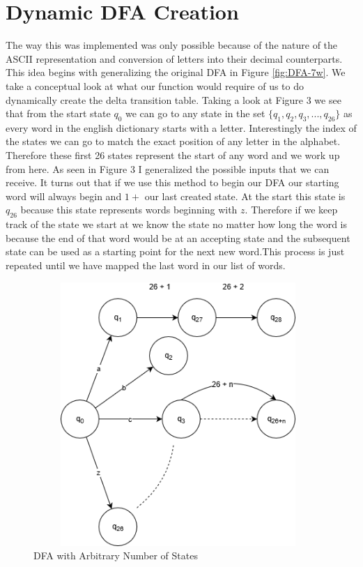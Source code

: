 \documentclass[letter, 12pt]{article}
\begin{document}
\section*{Dynamic DFA Creation}
The way this was implemented was only possible because of the nature of the ASCII representation and conversion of letters into their decimal counterparts. This idea begins with generalizing the original DFA in Figure \ref{fig:DFA-7w}. We take a conceptual look at what our function would require of us to do dynamically create the delta transition table. Taking a look at Figure 3 we see that from the start state $q_0$ we can go to any state in the set $\{q_1, q_2, q_3, ..., q_{26}\}$ as every word in the english dictionary starts with a letter. Interestingly the index of the states we can go to match the exact position of any letter in the alphabet. Therefore these first 26 states represent the start of any word and we work up from here. As seen in Figure 3 I generalized the possible inputs that we can receive. It turns out that if we use this method to begin our DFA our starting word will always begin and $1 + $ our last created state. At the start this state is $q_{26}$ because this state represents words beginning with $z$. Therefore if we keep track of the state we start at we know the state no matter how long the word is because the end of that word would be at an accepting state and the subsequent state can be used as a starting point for the next new word.This process is just repeated until we have mapped the last word in our list of words.
\begin{figure}[!htb]
  \includegraphics[width=11cm, height=10cm, keepaspectratio,]{AbitraryDFA}
  \caption{DFA with Arbitrary Number of States}
  \label{fig:DFA-A}
\end{figure}
\end{document}
